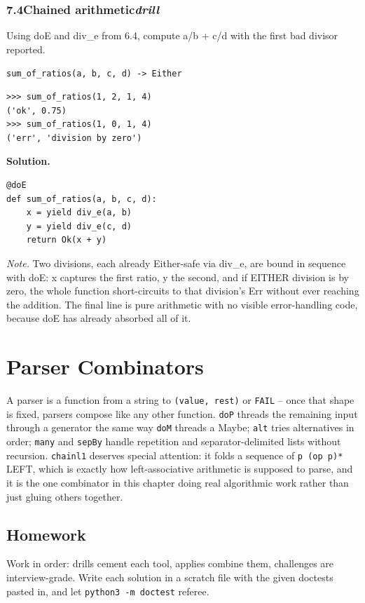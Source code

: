 \documentclass[10pt,letterpaper]{book}
\begin{document}
\subsection*{7.4\quad Chained arithmetic\hfill\textnormal{\textit{drill}}}
Using doE and div\_e from 6.4, compute a/b + c/d with the first bad divisor reported.

\noindent\texttt{sum\_of\_ratios(a, b, c, d) -> Either}
\begin{lstlisting}[style=ex]
>>> sum_of_ratios(1, 2, 1, 4)
('ok', 0.75)
>>> sum_of_ratios(1, 0, 1, 4)
('err', 'division by zero')
\end{lstlisting}
\noindent\textbf{Solution.}
\begin{lstlisting}[style=code]
@doE
def sum_of_ratios(a, b, c, d):
    x = yield div_e(a, b)
    y = yield div_e(c, d)
    return Ok(x + y)
\end{lstlisting}
\noindent\textit{Note.} Two divisions, each already Either-safe via div\_e, are bound in sequence with doE: x captures the first ratio, y the second, and if EITHER division is by zero, the whole function short-circuits to that division's Err without ever reaching the addition. The final line is pure arithmetic with no visible error-handling code, because doE has already absorbed all of it.

\clearpage
\chapter{Parser Combinators}

A parser is a function from a string to \texttt{(value, rest)} or
\texttt{FAIL} -- once that shape is fixed, parsers compose like any other
function. \texttt{doP} threads the remaining input through a generator the
same way \texttt{doM} threads a Maybe; \texttt{alt} tries alternatives in
order; \texttt{many} and \texttt{sepBy} handle repetition and
separator-delimited lists without recursion. \texttt{chainl1} deserves
special attention: it folds a sequence of \texttt{p (op p)*} LEFT, which is
exactly how left-associative arithmetic is supposed to parse, and it is the
one combinator in this chapter doing real algorithmic work rather than
just gluing others together.
\section{Homework}
Work in order: drills cement each tool, applies combine them,
challenges are interview-grade. Write each solution in a scratch file with
the given doctests pasted in, and let \texttt{python3 -m doctest} referee.
\end{document}
